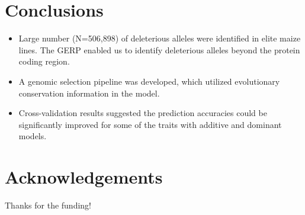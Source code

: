\documentclass[a0,portrait]{a0poster}
\begin{document}
\begin{multicols}{2}
\color{SaddleBrown} %

\section*{Conclusions}

\begin{itemize}
\item Large number (N=506,898) of deleterious alleles were identified in elite maize lines. The GERP enabled us to identify deleterious alleles beyond the protein coding region.
\item A genomic selection pipeline was developed, which utilized evolutionary conservation information in the model.
\item Cross-validation results suggested the prediction accuracies could be significantly improved for some of the traits with additive and dominant models. 


\end{itemize}

\color{DarkSlateGray} %








\section*{Acknowledgements}

Thanks for the funding!


\end{multicols}
\end{document}
